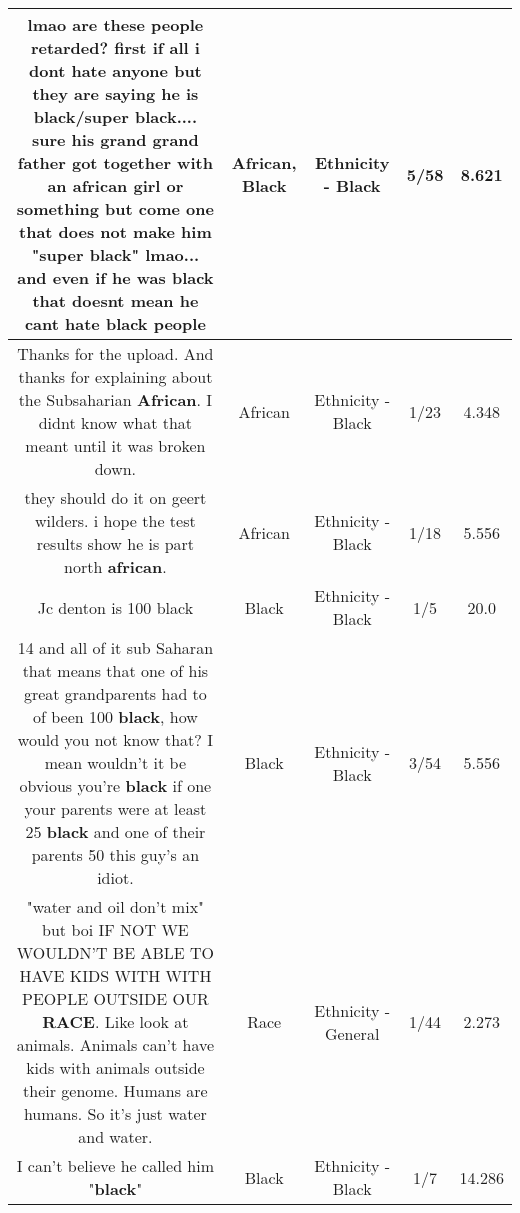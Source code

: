 \documentclass[11pt]{article}
\newlength\mylength
\begin{document}
\begin{center}
\begin{longtable}{|C{.65\mylength}|C{.30\mylength}|C{.12\mylength}|C{.12\mylength}|C{.12\mylength}|}
  \small lmao are these people retarded? first if all i dont hate anyone but they are saying he is \textbf{black}/super \textbf{black}.... sure his grand grand father got together with an \textbf{african} girl or something but come one that does not make him "super \textbf{black}" lmao... and even if he was \textbf{black} that doesnt mean he cant hate \textbf{black} people\normalsize   & African, Black & Ethnicity - Black & 5/58 & 8.621 \\  \hline
  \small Thanks for the upload. And thanks for explaining about the Subsaharian \textbf{African}. I didnt know what that meant until it was broken down.\normalsize   & African & Ethnicity - Black & 1/23 & 4.348 \\  \hline
  \small they should do it on geert wilders. i hope the test results show he is part north \textbf{african}.\normalsize   & African & Ethnicity - Black & 1/18 & 5.556 \\  \hline
  \small Jc denton is 100 black\normalsize   & Black & Ethnicity - Black & 1/5 & 20.0 \\  \hline
  \small 14 and all of it sub Saharan that means that one of his great grandparents had to of been 100 \textbf{black}, how would you not know that? I mean wouldn't it be obvious you're \textbf{black} if one your parents were at least 25 \textbf{black} and one of their parents 50 this guy's an idiot.\normalsize   & Black & Ethnicity - Black & 3/54 & 5.556 \\  \hline
  \small "water and oil don't mix" but boi IF NOT WE WOULDN'T BE ABLE TO HAVE KIDS WITH WITH PEOPLE OUTSIDE OUR \textbf{RACE}. Like look at animals. Animals can't have kids with animals outside their genome. Humans are humans. So it's just water and water.\normalsize   & Race & Ethnicity - General & 1/44 & 2.273 \\  \hline
  \small I can't believe he called him "\textbf{black}"\normalsize   & Black & Ethnicity - Black & 1/7 & 14.286 \\  \hline

\end{longtable}
\end{center}
\end{document}
